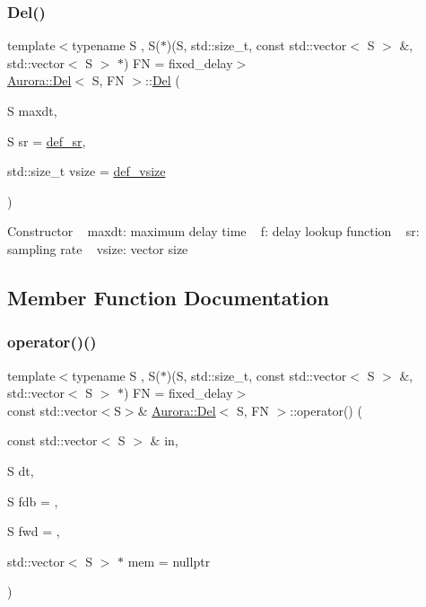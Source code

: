 \subsubsection{\texorpdfstring{Del()}{Del()}}
{\footnotesize\ttfamily template$<$typename S , S($\ast$)(\+S, std\+::size\+\_\+t, const std\+::vector$<$ S $>$ \&, std\+::vector$<$ S $>$ $\ast$) FN = fixed\+\_\+delay$>$ \\
\hyperlink{class_aurora_1_1_del}{Aurora\+::\+Del}$<$ S, FN $>$\+::\hyperlink{class_aurora_1_1_del}{Del} (\begin{DoxyParamCaption}\item[{S}]{maxdt,  }\item[{S}]{sr = {\ttfamily \hyperlink{namespace_aurora_ad49263d809bea98dd422e95bc91bc03e}{def\+\_\+sr}},  }\item[{std\+::size\+\_\+t}]{vsize = {\ttfamily \hyperlink{namespace_aurora_afaaddf667a06e7ce23c667a8b7295263}{def\+\_\+vsize}} }\end{DoxyParamCaption})\hspace{0.3cm}{\ttfamily [inline]}}

Constructor ~\newline
maxdt\+: maximum delay time ~\newline
f\+: delay lookup function ~\newline
sr\+: sampling rate ~\newline
vsize\+: vector size 

\subsection{Member Function Documentation}
\mbox{\label{class_aurora_1_1_del_a8ef3facc305826e66977b633bf5a6f15}} 
\subsubsection{\texorpdfstring{operator()()}{operator()()}\hspace{0.1cm}{\footnotesize\ttfamily [1/2]}}
{\footnotesize\ttfamily template$<$typename S , S($\ast$)(\+S, std\+::size\+\_\+t, const std\+::vector$<$ S $>$ \&, std\+::vector$<$ S $>$ $\ast$) FN = fixed\+\_\+delay$>$ \\
const std\+::vector$<$S$>$\& \hyperlink{class_aurora_1_1_del}{Aurora\+::\+Del}$<$ S, FN $>$\+::operator() (\begin{DoxyParamCaption}\item[{const std\+::vector$<$ S $>$ \&}]{in,  }\item[{S}]{dt,  }\item[{S}]{fdb = {},  }\item[{S}]{fwd = {},  }\item[{std\+::vector$<$ S $>$ $\ast$}]{mem = {\ttfamily nullptr} }\end{DoxyParamCaption})\hspace{0.3cm}{\ttfamily [inline]}}

